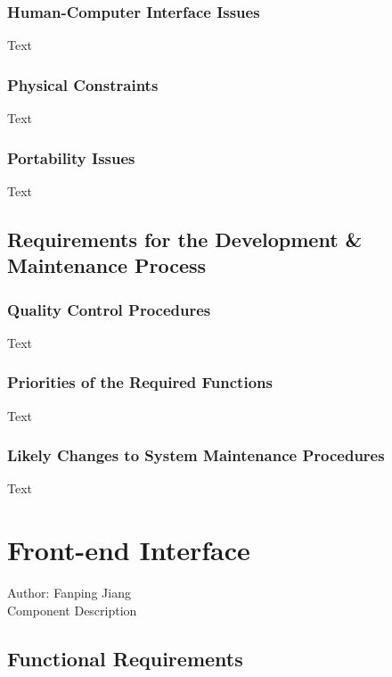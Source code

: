\documentclass[12pt]{article}
\begin{document}
\subsubsection {Human-Computer Interface Issues}

Text

\subsubsection {Physical Constraints}

Text

\subsubsection {Portability Issues}

Text

\subsection{Requirements for the Development & Maintenance Process}

\subsubsection {Quality Control Procedures}

Text

\subsubsection {Priorities of the Required Functions}

Text

\subsubsection {Likely Changes to System Maintenance Procedures}

Text

\section{Front-end Interface}
Author: Fanping Jiang\\

\noindent Component Description

\subsection{Functional Requirements}
\end{document}
